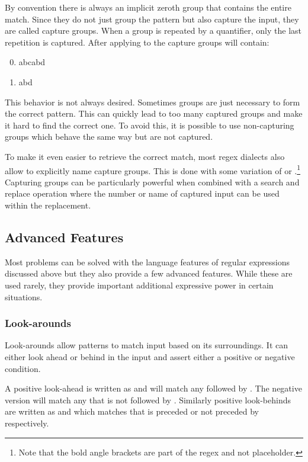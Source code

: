 By convention there is always an implicit zeroth group that contains the entire match. Since they do not just group the pattern but also capture the input, they are called capture groups. When a group is repeated by a quantifier, only the last repetition is captured. After applying  to  the capture groups will contain:

\begin{enumerate}
    \setcounter{enumi}{-1} 
    \itemsep0em
    \item abcabd
    \item abd
\end{enumerate}


This behavior is not always desired. Sometimes groups are just necessary to form the correct pattern. This can quickly lead to too many captured groups and make it hard to find the correct one. To avoid this, it is possible to use non-capturing groups  which behave the same way but are not captured. 

To make it even easier to retrieve the correct match, most regex dialects also allow to explicitly name capture groups. This is done with some variation of  or .\footnote{Note that the bold angle brackets are part of the regex and not placeholder.} Capturing groups can be particularly powerful when combined with a search and replace operation where the number or name of captured input can be used within the replacement.

\subsection{Advanced Features}

Most problems can be solved with the language features of regular expressions discussed above but they also provide a few advanced features. While these are used rarely, they provide important additional expressive power in certain situations.

\subsubsection{Look-arounds}

Look-arounds allow patterns to match input based on its surroundings. It can either look ahead or behind in the input and assert either a positive or negative condition.

A positive look-ahead is written as  and will match any  followed by . The negative version  will match any  that is not followed by . Similarly positive look-behinds are written as  and  which matches  that is preceded or not preceded by  respectively.

